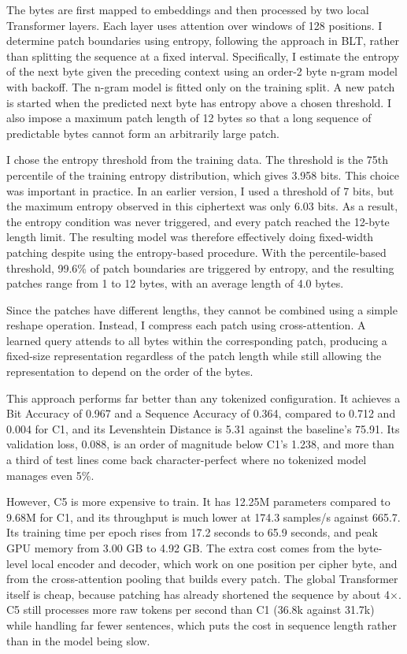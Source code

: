 \documentclass[12pt]{article}
\begin{document}
The bytes are first mapped to embeddings and then processed by two local Transformer
layers. Each layer uses attention over windows of 128 positions. I determine patch
boundaries using entropy, following the approach in BLT, rather than splitting the
sequence at a fixed interval. Specifically, I estimate the entropy of the next byte
given the preceding context using an order-2 byte n-gram model with backoff. The n-gram
model is fitted only on the training split. A new patch is started when the predicted
next byte has entropy above a chosen threshold. I also impose a maximum patch length of
12 bytes so that a long sequence of predictable bytes cannot form an arbitrarily large patch.

I chose the entropy threshold from the training data. The threshold is the 75th percentile of 
the training entropy distribution, which gives 3.958 bits. This choice was important in practice.
In an earlier version, I used a threshold of 7 bits, but the maximum entropy observed in this
ciphertext was only 6.03 bits. As a result, the entropy condition was never triggered,
and every patch reached the 12-byte length limit. The resulting model was therefore
effectively doing fixed-width patching despite using the entropy-based procedure.
With the percentile-based threshold, 99.6\% of patch boundaries are triggered by entropy,
and the resulting patches range from 1 to 12 bytes, with an average length of 4.0 bytes.

Since the patches have different lengths, they cannot be combined using a simple reshape
operation. Instead, I compress each patch using cross-attention. A learned query attends
to all bytes within the corresponding patch, producing a fixed-size representation regardless
of the patch length while still allowing the representation to depend on the order of the bytes.

This approach performs far better than any tokenized configuration. It achieves
a Bit Accuracy of 0.967 and a Sequence Accuracy of 0.364, compared to 0.712 and
0.004 for C1, and its Levenshtein Distance is 5.31 against the baseline's 75.91.
Its validation loss, 0.088, is an order of magnitude below C1's 1.238, and more
than a third of test lines come back character-perfect where no tokenized model
manages even 5\%.

However, C5 is more expensive to train. It has 12.25M parameters compared to
9.68M for C1, and its throughput is much lower at 174.3 samples/s against 665.7.
Its training time per epoch rises from 17.2 seconds to 65.9 seconds, and peak GPU
memory from 3.00 GB to 4.92 GB. The extra cost comes from the byte-level local
encoder and decoder, which work on one position per cipher byte, and from the
cross-attention pooling that builds every patch. The global Transformer itself is
cheap, because patching has already shortened the sequence by about 4$\times$. C5
still processes more raw tokens per second than C1 (36.8k against 31.7k) while
handling far fewer sentences, which puts the cost in sequence length rather
than in the model being slow.
\end{document}
